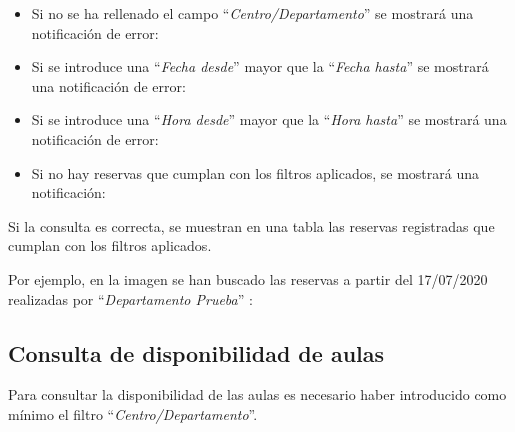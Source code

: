\begin{itemize}
    \item Si no se ha rellenado el campo ``\textit{Centro/Departamento}'' se mostrará una notificación de error:
    
    
    \item Si se introduce una ``\textit{Fecha desde}'' mayor que la ``\textit{Fecha hasta}'' se mostrará una notificación de error:
    
    
    \item Si se introduce una ``\textit{Hora desde}'' mayor que la ``\textit{Hora hasta}'' se mostrará una notificación de error:
    
    
    \item Si no hay reservas que cumplan con los filtros aplicados, se mostrará una notificación:
    
\end{itemize}

Si la consulta es correcta, se muestran en una tabla las reservas registradas que cumplan con los filtros aplicados.

\begin{landscape}
    Por ejemplo, en la imagen se han buscado las reservas a partir del 17/07/2020 realizadas por ``\textit{Departamento Prueba}'' :

\end{landscape}


\subsection{Consulta de disponibilidad de aulas}
Para consultar la disponibilidad de las aulas es necesario haber introducido como mínimo el filtro ``\textit{Centro/Departamento}''. 

